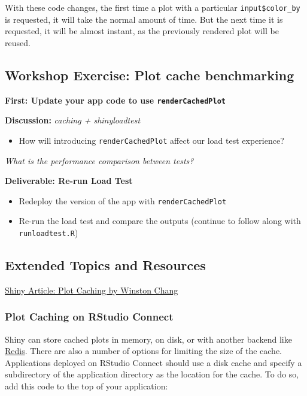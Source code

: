 \documentclass[]{book}
\providecommand{\tightlist}{%
  \setlength{\itemsep}{0pt}\setlength{\parskip}{0pt}}
\theoremstyle{definition}
\theoremstyle{definition}
\theoremstyle{definition}
\theoremstyle{remark}
\begin{document}
With these code changes, the first time a plot with a particular
\texttt{input\$color\_by} is requested, it will take the normal amount
of time. But the next time it is requested, it will be almost instant,
as the previously rendered plot will be reused.

\hypertarget{workshop-exercise-plot-cache-benchmarking}{%
\subsection{Workshop Exercise: Plot cache
benchmarking}\label{workshop-exercise-plot-cache-benchmarking}}

\textbf{First: Update your app code to use \texttt{renderCachedPlot}}

\textbf{Discussion:} \emph{caching + shinyloadtest}

\begin{itemize}
\tightlist
\item
  How will introducing \texttt{renderCachedPlot} affect our load test
  experience?
\end{itemize}

\emph{What is the performance comparison between tests?}

\textbf{Deliverable: Re-run Load Test}

\begin{itemize}
\tightlist
\item
  Redeploy the version of the app with \texttt{renderCachedPlot}
\item
  Re-run the load test and compare the outputs (continue to follow along
  with \texttt{runloadtest.R})
\end{itemize}

\hypertarget{extended-topics-and-resources-1}{%
\subsection{Extended Topics and
Resources}\label{extended-topics-and-resources-1}}

\href{http://shiny.rstudio.com/articles/plot-caching.html}{Shiny
Article: Plot Caching by Winston Chang}

\hypertarget{plot-caching-on-rstudio-connect}{%
\subsubsection{Plot Caching on RStudio
Connect}\label{plot-caching-on-rstudio-connect}}

Shiny can store cached plots in memory, on disk, or with another backend
like \href{https://redis.io/}{Redis}. There are also a number of options
for limiting the size of the cache. Applications deployed on RStudio
Connect should use a disk cache and specify a subdirectory of the
application directory as the location for the cache. To do so, add this
code to the top of your application:
\end{document}
